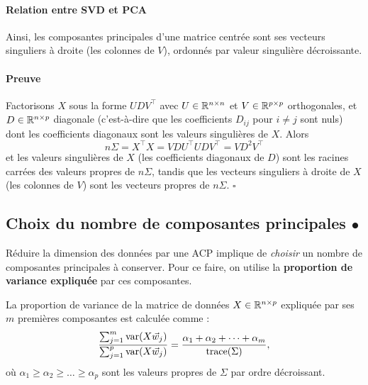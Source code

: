 \paragraph{Relation entre SVD et PCA}
Ainsi, les composantes principales d'une matrice centrée sont ses vecteurs
singuliers à droite (les colonnes de $V$), ordonnés par valeur singulière
décroissante.

\paragraph{Preuve}
Factorisons $X$ sous la forme $U D V^\top$ avec $U \in \mathbb{R}^{n \times n}$ et
$V \in \mathbb{R}^{p \times p}$ orthogonales, et $D \in \mathbb{R}^{n \times p}$ diagonale (c'est-à-dire que les
coefficients $D_{ij}$ pour $i \neq j$ sont nuls) dont les coefficients
diagonaux sont les valeurs singulières de $X$. Alors
\begin{equation*}
 n \Sigma = X^\top X = V D U^\top U D V^\top = V D^2 V^\top
\end{equation*}
et les valeurs singulières de $X$ (les coefficients diagonaux de $D$) sont les racines carrées
des valeurs propres de $n \Sigma$, tandis que les vecteurs singuliers à droite de
$X$ (les colonnes de $V$) sont les vecteurs propres de $n \Sigma$. \hfill $\square$
  

\subsection{Choix du nombre de composantes principales $\bullet$}
Réduire la dimension des données par une ACP implique de {\it choisir} un
nombre de composantes principales à conserver. Pour ce faire, on utilise la
\textbf{proportion de variance expliquée} par ces composantes.

La proportion de variance de la matrice de données $X \in \mathbb{R}^{n \times p}$ expliquée
par ses $m$ premières composantes est calculée comme :
\begin{equation}
  \label{eq:var_explained}
  \frac{\sum_{j=1}^m \text{var}(X \ww_j)}{\sum_{j=1}^p \text{var}(X \ww_j)} = \frac{\alpha_1 + \alpha_2 + \dots + \alpha_m}{\text{trace}(\Sigma)},
\end{equation}
où $\alpha_1 \geq \alpha_2 \geq \dots \geq \alpha_p$ sont les valeurs propres
de $\Sigma$ par ordre décroissant.
  
